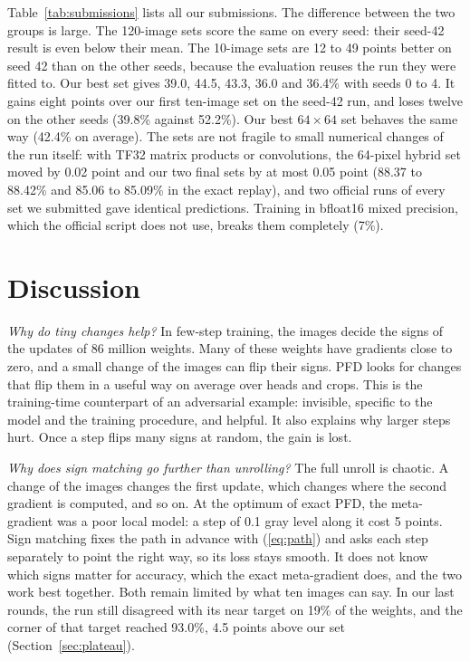 \documentclass[journal]{IEEEtran}
\begin{document}
Table~\ref{tab:submissions} lists all our submissions. The difference between the two groups is large. The 120-image
sets score the same on every seed: their seed-42 result is even below their mean. The 10-image sets are 12 to
49 points better on seed 42 than on the other seeds, because the evaluation reuses the run they were fitted to.
Our best set gives 39.0, 44.5, 43.3, 36.0 and 36.4\% with seeds 0 to 4. It gains eight points over our first
ten-image set on the seed-42 run, and loses twelve on the other seeds (39.8\% against 52.2\%). Our best
$64\times64$ set behaves the same way (42.4\% on average). The sets are not fragile to small numerical changes of the run
itself: with TF32 matrix products or convolutions, the 64-pixel hybrid set moved by 0.02 point and our two final
sets by at most 0.05 point (88.37 to 88.42\% and 85.06 to 85.09\% in the exact replay), and two official runs of
every set we submitted gave identical predictions. Training in bfloat16 mixed precision, which the official script
does not use, breaks them completely (7\%).

\section{Discussion}

\emph{Why do tiny changes help?} In few-step training, the images decide the signs of the updates of 86 million
weights. Many of these weights have gradients close to zero, and a small change of the images can flip their signs.
PFD looks for changes that flip them in a useful way on average over heads and crops. This is the training-time
counterpart of an adversarial example: invisible, specific to the model and the training procedure, and helpful.
It also explains why larger steps hurt. Once a step flips many signs at random, the gain is lost.

\emph{Why does sign matching go further than unrolling?} The full unroll is chaotic. A change of the images changes
the first update, which changes where the second gradient is computed, and so on. At the optimum of exact PFD, the
meta-gradient was a poor local model: a step of 0.1 gray level along it cost 5 points. Sign matching fixes the path
in advance with (\ref{eq:path}) and asks each step separately to point the right way, so its loss stays smooth. It
does not know which signs matter for accuracy, which the exact meta-gradient does, and the two work best together.
Both remain limited by what ten images can say. In our last rounds, the run still disagreed with its near target on
19\% of the weights, and the corner of that target reached 93.0\%, 4.5 points above our set
(Section~\ref{sec:plateau}).
\end{document}

